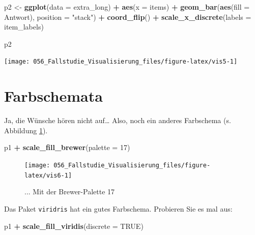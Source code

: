 \documentclass[12pt,ngerman,]{book}
\makeatletter
\newenvironment{Shaded}{\begin{snugshade}}{\end{snugshade}}
\newcommand{\KeywordTok}[1]{\textcolor[rgb]{0.13,0.29,0.53}{\textbf{#1}}}
\newcommand{\DataTypeTok}[1]{\textcolor[rgb]{0.13,0.29,0.53}{#1}}
\newcommand{\DecValTok}[1]{\textcolor[rgb]{0.00,0.00,0.81}{#1}}
\newcommand{\StringTok}[1]{\textcolor[rgb]{0.31,0.60,0.02}{#1}}
\newcommand{\OtherTok}[1]{\textcolor[rgb]{0.56,0.35,0.01}{#1}}
\newcommand{\OperatorTok}[1]{\textcolor[rgb]{0.81,0.36,0.00}{\textbf{#1}}}
\newcommand{\NormalTok}[1]{#1}
\newenvironment{kframe}{%
\medskip{}
\setlength{\fboxsep}{.8em}
 \def\at@end@of@kframe{}%
 \ifinner\ifhmode%
  \def\at@end@of@kframe{\end{minipage}}%
  \begin{minipage}{\columnwidth}%
 \fi\fi%
 \def\FrameCommand##1{\hskip\@totalleftmargin \hskip-\fboxsep
 \colorbox{shadecolor}{##1}\hskip-\fboxsep
     \hskip-\linewidth \hskip-\@totalleftmargin \hskip\columnwidth}%
 \MakeFramed {\advance\hsize-\width
   \@totalleftmargin\z@ \linewidth\hsize
   \@setminipage}}%
 {\par\unskip\endMakeFramed%
 \at@end@of@kframe}
\renewenvironment{Shaded}{\begin{kframe}}{\end{kframe}}
\theoremstyle{definition}
\theoremstyle{definition}
\theoremstyle{remark}
\makeatother
\begin{document}
\begin{Shaded}
\begin{Highlighting}[]
\NormalTok{p2 <-}\StringTok{ }\KeywordTok{ggplot}\NormalTok{(}\DataTypeTok{data =}\NormalTok{ extra_long) }\OperatorTok{+}
\StringTok{  }\KeywordTok{aes}\NormalTok{(}\DataTypeTok{x =}\NormalTok{ items)  }\OperatorTok{+}
\StringTok{  }\KeywordTok{geom_bar}\NormalTok{(}\KeywordTok{aes}\NormalTok{(}\DataTypeTok{fill =}\NormalTok{ Antwort), }\DataTypeTok{position =} \StringTok{"stack"}\NormalTok{) }\OperatorTok{+}
\StringTok{  }\KeywordTok{coord_flip}\NormalTok{() }\OperatorTok{+}
\StringTok{  }\KeywordTok{scale_x_discrete}\NormalTok{(}\DataTypeTok{labels =}\NormalTok{ item_labels) }

\NormalTok{p2}
\end{Highlighting}
\end{Shaded}

\begin{center}\texttt{[image: 056\_Fallstudie\_Visualisierung\_files/figure-latex/vis5-1]} \end{center}

\section{Farbschemata}\label{farbschemata}

Ja, die Wünsche hören nicht auf\ldots{} Also, noch ein anderes
Farbschema (s. Abbildung \ref{fig:vis6}).

\begin{Shaded}
\begin{Highlighting}[]
\NormalTok{p1 }\OperatorTok{+}
\StringTok{  }\KeywordTok{scale_fill_brewer}\NormalTok{(}\DataTypeTok{palette =} \DecValTok{17}\NormalTok{)}
\end{Highlighting}
\end{Shaded}

\begin{figure}

{\centering \texttt{[image: 056\_Fallstudie\_Visualisierung\_files/figure-latex/vis6-1]} 

}

\caption{... Mit der Brewer-Palette 17}\label{fig:vis6}
\end{figure}

Das Paket \texttt{viridris} hat ein gutes Farbschema. Probieren Sie es
mal aus:

\begin{Shaded}
\begin{Highlighting}[]
\NormalTok{p1 }\OperatorTok{+}
\StringTok{  }\KeywordTok{scale_fill_viridis}\NormalTok{(}\DataTypeTok{discrete =} \OtherTok{TRUE}\NormalTok{)}
\end{Highlighting}
\end{Shaded}
\end{document}
